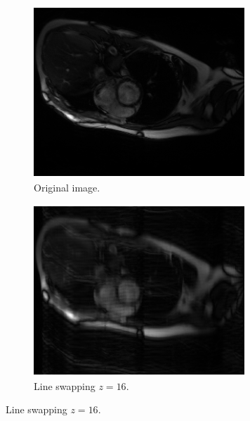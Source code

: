 \begin{figure}[h] %
	\centering
	\begin{subfigure}{0.325\textwidth}
    		\includegraphics[width=\textwidth]{./Images/LineSwappingOriginal.png}
    		\caption{Original image.}
    		\label{fig:LineSwappingOriginal}
	\end{subfigure}
	\hfill
	\begin{subfigure}{0.325\textwidth}
    		\includegraphics[width=\textwidth]{./Images/LineSwapping16.png}
    		\caption{Line swapping $z=16$.}
    		\label{fig:LineSwapping16}

\end{subfigure}
\end{figure}
